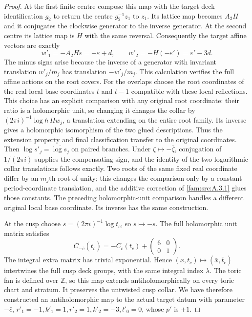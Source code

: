 \begin{proof}
At the first finite centre compose this map with the target deck identification $g_2$ to return the centre $g_2^{-1}z_1$ to $z_1$. Its lattice map becomes $A_2H$ and it conjugates the clockwise generator to the inverse generator. At the second centre its lattice map is $H$ with the same reversal. Consequently the target affine vectors are exactly
\[
 w'_1=-A_2H\varepsilon=-\varepsilon+d,\qquad
 w'_2=-H(-\varepsilon')=\varepsilon'-3d.
\]
The minus signs arise because the inverse of a generator with invariant translation $w'_j/m_j$ has translation $-w'_j/m_j$. This calculation verifies the full affine actions on the root covers. For the overlaps choose the root coordinates of the real local base coordinates $t$ and $t-1$ compatible with these local reflections. This choice has an explicit comparison with any original root coordinate: their ratio is a holomorphic unit, so changing it changes the collar by $(2\pi i)^{-1}\log h\,\Pi w_j$, a translation extending on the entire root family. Its inverse gives a holomorphic isomorphism of the two glued descriptions. Thus the extension property and final classification transfer to the original coordinates. Then $\log s'_j=\overline{\log s_j}$ on paired branches. Under $\zeta\mapsto-\bar\zeta$, conjugation of $1/(2\pi i)$ supplies the compensating sign, and the identity of the two logarithmic collar translations follows exactly. Two roots of the same fixed real coordinate differ by an $m_j$th root of unity; this changes the comparison only by a constant period-coordinate translation, and the additive correction of \ref{fam:src:A.3.1} glues those constants. The preceding holomorphic-unit comparison handles a different original local base coordinate. Its inverse has the same construction.

At the cusp choose $s=(2\pi i)^{-1}\log t_c$, so $s\mapsto-\bar s$. The full holomorphic unit matrix satisfies
\[
 C_{-\bar c}(\bar t_c)=-\overline{C_c(t_c)}+
       \begin{pmatrix}6&0\\0&1\end{pmatrix}.
\]
The integral extra matrix has trivial exponential. Hence $(x,t_c)\mapsto(\bar x,\bar t_c)$ intertwines the full cusp deck groups, with the same integral index $\lambda$. The toric fan is defined over $\mathbb Z$, so this map extends antiholomorphically on every toric chart and stratum. It preserves the untwisted cusp collar. We have therefore constructed an antiholomorphic map to the actual target datum with parameter $-\bar c$, $r'_1=-1,k'_1=1,r'_2=1,k'_2=-3,l'_0=0$, whose $p'$ is $+1$.


\end{proof}
